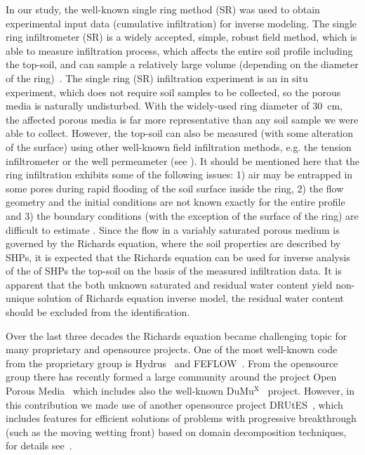 \documentclass[review]{myarticle}
\begin{document}
In our study, the well-known single ring method (SR) was used to obtain experimental input data (cumulative infiltration) for inverse modeling. The  single ring infiltrometer (SR) is a widely accepted, simple, robust field method, which is able to measure infiltration process, which affects the entire soil profile including the top-soil,  and can sample a relatively large volume (depending on the diameter of the ring)~\citep{Cheng,ReynoldsWD}.  The single ring (SR) infiltration experiment is an in situ experiment, which does not require soil samples to be collected, so the porous media is naturally undisturbed. With the widely-used ring diameter of 30~cm, the affected porous media is far more representative than any soil sample  we were able to collect. However, the top-soil can also be measured (with some alteration of the surface) using other well-known field infiltration methods, e.g. the tension infiltrometer or the well permeameter (see \citep{AnguloJaramillo,ReynoldsWDGP}). 
 It should be mentioned here that the ring  infiltration exhibits some of the following issues: 1) air may be entrapped in some pores during rapid flooding of the soil surface inside the ring, 2) the flow geometry and the  initial conditions are not known exactly for the entire profile and 3) the boundary conditions (with the exception of the surface of the ring) are difficult to estimate  \citep{Jacka1,Fodor}.
Since the flow in a variably saturated porous medium is governed by the Richards equation, where the soil properties are described by SHPs, it is expected that the Richards equation can be used for inverse analysis of the of SHPs the top-soil on the basis of the measured infiltration data. It is apparent that the both unknown saturated and residual water content yield non-unique solution of Richards equation inverse model, the residual water content should be excluded from the identification.

Over the last three decades the Richards equation became challenging topic for many proprietary and opensource projects. 
 One of the most well-known code from the proprietary group is Hydrus~\citep{SimunekJ} and FEFLOW~\citep{feflow}. From the opensource group there has recently formed a large community around the project Open Porous Media~\citep{opm} which includes also the well-known DuMu$^{\textrm{X}}$~\citep{dumux} project. However, in this contribution we made use of another opensource project DRUtES~\citep{drutes}, which includes features for efficient solutions of problems with progressive breakthrough (such as the moving wetting front) based on domain decomposition techniques, for details see~\citep{mojecomp, mojejcam2, mojeamc2}.
\end{document}
